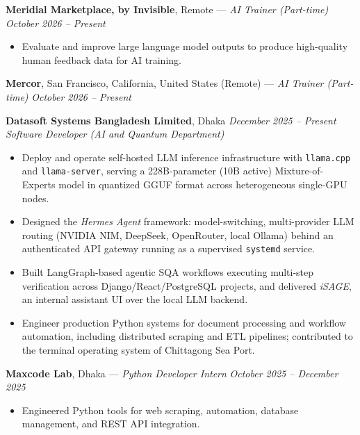 \documentclass[a4paper,10pt]{article}
\begin{document}
\textbf{Meridial Marketplace, by Invisible}, Remote --- \textit{AI Trainer (Part-time)}
\hfill
\textit{October 2026 -- Present}

\begin{itemize}
    \item Evaluate and improve large language model outputs to produce high-quality human feedback data for AI training.
\end{itemize}

\vspace{2pt}
\textbf{Mercor}, San Francisco, California, United States (Remote) --- \textit{AI Trainer (Part-time)}
\hfill
\textit{October 2026 -- Present}

\vspace{2pt}
\textbf{Datasoft Systems Bangladesh Limited}, Dhaka
\hfill
\textit{December 2025 -- Present}
\\
\textit{Software Developer (AI and Quantum Department)}

\begin{itemize}
    \item Deploy and operate self-hosted LLM inference infrastructure with \texttt{llama.cpp} and \texttt{llama-server}, serving a 228B-parameter (10B active) Mixture-of-Experts model in quantized GGUF format across heterogeneous single-GPU nodes.

    \item Designed the \textit{Hermes Agent} framework: model-switching, multi-provider LLM routing (NVIDIA NIM, DeepSeek, OpenRouter, local Ollama) behind an authenticated API gateway running as a supervised \texttt{systemd} service.

    \item Built LangGraph-based agentic SQA workflows executing multi-step verification across Django/React/PostgreSQL projects, and delivered \textit{iSAGE}, an internal assistant UI over the local LLM backend.

    \item Engineer production Python systems for document processing and workflow automation, including distributed scraping and ETL pipelines; contributed to the terminal operating system of Chittagong Sea Port.
\end{itemize}

\vspace{2pt}
\begin{minipage}{\textwidth}
\textbf{Maxcode Lab}, Dhaka --- \textit{Python Developer Intern}
\hfill
\textit{October 2025 -- December 2025}

\begin{itemize}
    \item Engineered Python tools for web scraping, automation, database management, and REST API integration.
\end{itemize}
\end{minipage}
\end{document}

